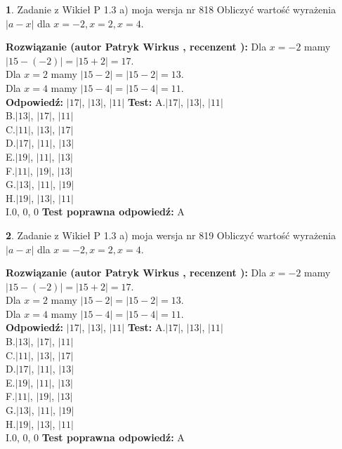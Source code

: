 \documentclass[12pt, a4paper]{article}
\theoremstyle{definition} %
\newtheorem{zad}{}
\newcommand{\zadStart}[1]{\begin{zad}#1\newline}
\newcommand{\zadStop}{\end{zad}}
\newcommand{\rozwStart}[2]{\noindent \textbf{Rozwiązanie (autor #1 , recenzent #2): }\newline}
\newcommand{\rozwStop}{\newline}
\newcommand{\odpStart}{\noindent \textbf{Odpowiedź:}\newline}
\newcommand{\odpStop}{\newline}
\newcommand{\testStart}{\noindent \textbf{Test:}\newline}
\newcommand{\testStop}{\newline}
\newcommand{\kluczStart}{\noindent \textbf{Test poprawna odpowiedź:}\newline}
\newcommand{\kluczStop}{\newline}
\begin{document}
\zadStart{Zadanie z Wikieł P 1.3 a) moja wersja nr 818}
Obliczyć wartość wyrażenia $|a - x|$ dla $x=-2,x=2,x=4$.
\zadStop
\rozwStart{Patryk Wirkus}{}
Dla $x = -2$ mamy $|15 - (-2)| = |15 + 2| = 17$.\\
Dla $x = 2$ mamy $|15 - 2| = |15 - 2| = 13$.\\
Dla $x = 4$ mamy $|15 - 4| = |15 - 4| = 11$.\\
\rozwStop
\odpStart
$|17|$, $|13|$, $|11|$
\odpStop
\testStart
A.$|17|$, $|13|$, $|11|$\\
B.$|13|$, $|17|$, $|11|$\\
C.$|11|$, $|13|$, $|17|$\\
D.$|17|$, $|11|$, $|13|$\\
E.$|19|$, $|11|$, $|13|$\\
F.$|11|$, $|19|$, $|13|$\\
G.$|13|$, $|11|$, $|19|$\\
H.$|19|$, $|13|$, $|11|$\\
I.$0$, $0$, $0$
\testStop
\kluczStart
A
\kluczStop



\zadStart{Zadanie z Wikieł P 1.3 a) moja wersja nr 819}
Obliczyć wartość wyrażenia $|a - x|$ dla $x=-2,x=2,x=4$.
\zadStop
\rozwStart{Patryk Wirkus}{}
Dla $x = -2$ mamy $|15 - (-2)| = |15 + 2| = 17$.\\
Dla $x = 2$ mamy $|15 - 2| = |15 - 2| = 13$.\\
Dla $x = 4$ mamy $|15 - 4| = |15 - 4| = 11$.\\
\rozwStop
\odpStart
$|17|$, $|13|$, $|11|$
\odpStop
\testStart
A.$|17|$, $|13|$, $|11|$\\
B.$|13|$, $|17|$, $|11|$\\
C.$|11|$, $|13|$, $|17|$\\
D.$|17|$, $|11|$, $|13|$\\
E.$|19|$, $|11|$, $|13|$\\
F.$|11|$, $|19|$, $|13|$\\
G.$|13|$, $|11|$, $|19|$\\
H.$|19|$, $|13|$, $|11|$\\
I.$0$, $0$, $0$
\testStop
\kluczStart
A
\kluczStop
\end{document}
